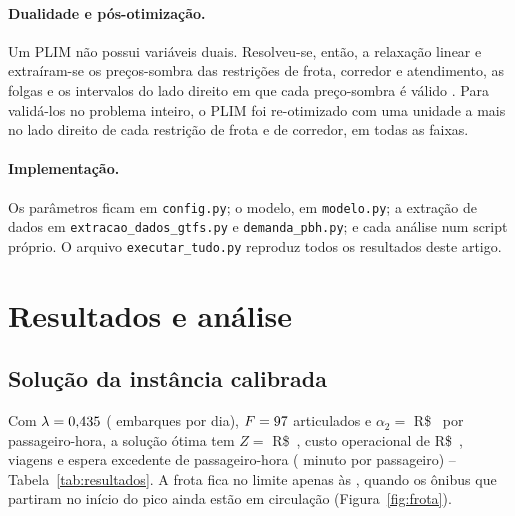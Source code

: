 \documentclass[11pt,a4paper]{article}
\newcommand{\tabela}[1]{\resizebox{\ifdim\width>\textwidth\textwidth\else\width\fi}{!}{}}
\begin{document}
\paragraph{Dualidade e pós-otimização.}
Um PLIM não possui variáveis duais. Resolveu-se, então, a relaxação linear e
extraíram-se os preços-sombra das restrições de frota, corredor e atendimento,
as folgas e os intervalos do lado direito em que cada preço-sombra é válido
\citep{arenales2007}. Para validá-los no problema inteiro, o PLIM foi
re-otimizado com uma unidade a mais no lado direito de cada restrição de frota e
de corredor, em todas as faixas.

\paragraph{Implementação.}
Os parâmetros ficam em \texttt{config.py}; o modelo, em \texttt{modelo.py}; a
extração de dados em \texttt{extracao\_dados\_gtfs.py} e
\texttt{demanda\_pbh.py}; e cada análise num script próprio. O arquivo
\texttt{executar\_tudo.py} reproduz todos os resultados deste artigo.

\section{Resultados e análise}\label{sec:resultados}

\subsection{Solução da instância calibrada}

Com $\lambda=0{,}435$ (\demandaTotal{} embarques por dia),
$F=97$ articulados e $\alpha_2=$ R\$~\alfaDois{} por passageiro-hora, a
solução ótima tem $Z=$ R\$~\Zotimo{}, custo operacional de R\$~\custoTotal{},
\viagensTotal{} viagens e espera excedente de \esperaPash{} passageiro-hora
(\esperaMin{} minuto por passageiro) -- Tabela~\ref{tab:resultados}. A frota
fica no limite apenas às \horaPrecoMax{}, quando os ônibus que partiram no
início do pico ainda estão em circulação (Figura~\ref{fig:frota}).

\begin{table}[htbp]
\centering
\caption{Solução ótima por linha na instância calibrada (valores diários).}
\label{tab:resultados}
\small
\tabela{tabelas/resultados_linhas.tex}
\end{table}
\end{document}
